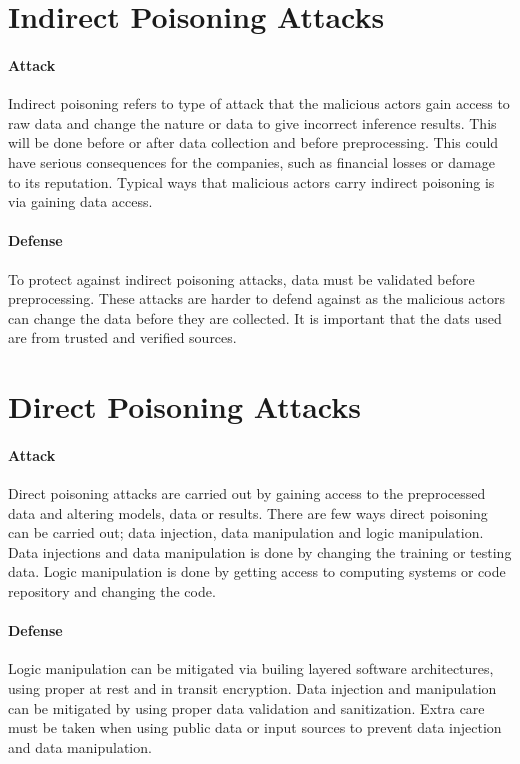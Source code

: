 \documentclass[11pt]{article}
\begin{document}
\section{Indirect Poisoning Attacks}
\label{sec:poisoning}

\paragraph{Attack}{
    Indirect poisoning refers to type of attack that the malicious actors gain access to raw data and change the nature or data to give incorrect inference results. This will be done before or after data collection and before preprocessing. This could have serious consequences for the companies, such as financial losses or damage to its reputation. Typical ways that malicious actors carry indirect poisoning is via gaining data access.
}

\paragraph{Defense}{
    To protect against indirect poisoning attacks, data must be validated before preprocessing. These attacks are harder to defend against as the malicious actors can change the data before they are collected. It is important that the dats used are from trusted and verified sources.
}

\section{Direct Poisoning Attacks}
\label{sec:data_manipulation}

\paragraph{Attack}{
    Direct poisoning attacks are carried out by gaining access to the preprocessed data and altering models, data or results. There are few ways direct poisoning can be carried out; data injection, data manipulation and logic manipulation. Data injections and data manipulation is done by changing the training or testing data. Logic manipulation is done by getting access to computing systems or code repository and changing the code.
}

\paragraph{Defense}{
    Logic manipulation can be mitigated via builing layered software architectures, using proper at rest and in transit encryption. Data injection and manipulation can be mitigated by using proper data validation and sanitization. Extra care must be taken when using public data or input sources to prevent data injection and data manipulation.
}
\end{document}
